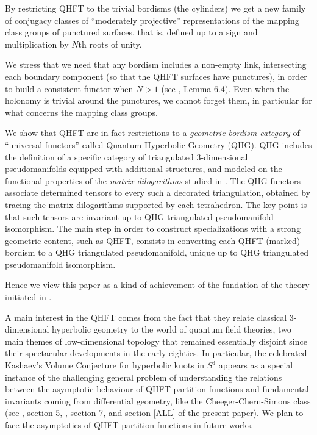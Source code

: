 By restricting QHFT to the trivial bordisms (the cylinders) we get
a new family of conjugacy classes of ``moderately projective''
representations of the mapping class groups of punctured surfaces,
that is, defined up to a sign and multiplication by $N$th roots of
unity.
\smallskip

We stress that we need that any bordism includes a non-empty link,
intersecting each boundary component (so that the QHFT surfaces
have punctures), in order to build a consistent functor when $N>1$
(see \cite{BB2}, Lemma 6.4). Even when the holonomy is trivial
around the punctures, we cannot forget them, in particular for
what concerns the mapping class groups.
\smallskip

We show that QHFT are in fact restrictions to a {\it geometric bordism
  category} of ``universal functors'' called Quantum Hyperbolic
Geometry (QHG). QHG includes the definition of a specific category of
triangulated 3-dimensional pseudomanifolds equipped with additional
structures, and modeled on the functional properties of the {\it
  matrix dilogarithms} studied in \cite{BB2}.  The QHG functors
associate determined tensors to every such a decorated triangulation,
obtained by tracing the matrix dilogarithms supported by each
tetrahedron. The key point is that such tensors are invariant up to
QHG triangulated pseudomanifold isomorphism.  The main step in order
to construct specializations with a strong geometric content, such as
QHFT, consists in converting each QHFT (marked) bordism to a QHG
triangulated pseudomanifold, unique up to QHG triangulated
pseudomanifold isomorphism.
\smallskip

Hence we view this paper as a kind of achievement of the fundation of
the theory initiated in \cite{BB1, BB2}.
\smallskip

A main interest in the QHFT comes from the fact that they relate
classical $3$-dimensional hyperbolic geometry to the world of quantum
field theories, two main themes of low-dimensional topology that
remained essentially disjoint since their spectacular developments in
the early eighties. In particular, the celebrated Kashaev's Volume
Conjecture for hyperbolic knots in $S^3$ \cite{K2} appears as a
special instance of the challenging general problem of understanding
the relations between the asymptotic behaviour of QHFT partition
functions and fundamental invariants coming from differential
geometry, like the Cheeger-Chern-Simons class (see \cite{BB1}, section
5, \cite{BB2}, section 7, and section \ref{ALL} of the present
paper). We plan to face the asymptotics of QHFT partition functions in
future works.
\smallskip

